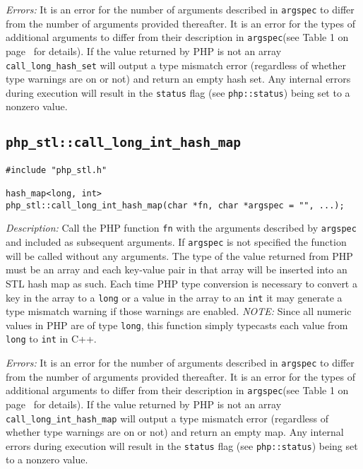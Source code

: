 \documentclass[11pt,titlepage]{article}
\begin{document}
\emph{Errors:} It is an error for the number of arguments described in \verb|argspec| to differ from the number of arguments provided thereafter. It is an error for the types of additional arguments to differ from their description in \verb|argspec|(see Table 1 on page~\pageref{Table1} for details). If the value returned by PHP is not an array \verb|call_long_hash_set| will output a type mismatch error (regardless of whether type warnings are on or not) and return an empty hash set. Any internal errors during execution will result in the \verb|status| flag (see \verb|php::status|) being set to a nonzero value.


\subsection{\texttt{php\_stl::call\_long\_int\_hash\_map}}

\begin{verbatim}
#include "php_stl.h"

hash_map<long, int> 
php_stl::call_long_int_hash_map(char *fn, char *argspec = "", ...);
\end{verbatim}

\emph{Description:} Call the PHP function \verb|fn| with the arguments described by \verb|argspec| and included as subsequent arguments. If \verb|argspec| is not specified the function will be called without any arguments. The type of the value returned from PHP must be an array and each key-value pair in that array will be inserted into an STL hash map as such. Each time PHP type conversion is necessary to convert a key in the array to a \verb|long| or a value in the array to an \verb|int| it may generate a type mismatch warning if those warnings are enabled. \emph{NOTE:} Since all numeric values in PHP are of type \verb|long|, this function simply typecasts each value from \verb|long| to \verb|int| in C++.

\emph{Errors:} It is an error for the number of arguments described in \verb|argspec| to differ from the number of arguments provided thereafter. It is an error for the types of additional arguments to differ from their description in \verb|argspec|(see Table 1 on page~\pageref{Table1} for details). If the value returned by PHP is not an array \verb|call_long_int_hash_map| will output a type mismatch error (regardless of whether type warnings are on or not) and return an empty map. Any internal errors during execution will result in the \verb|status| flag (see \verb|php::status|) being set to a nonzero value.
\end{document}
